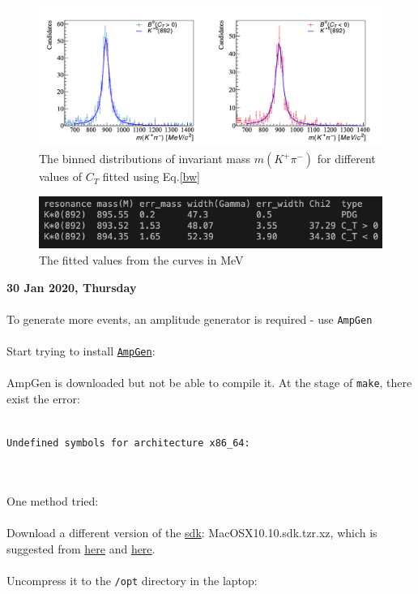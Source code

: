 \begin{figure}[h]
\center
\includegraphics*[width=0.86\linewidth]{CM_variables_B0/invmass_KpPim_fit}
\caption{The binned distributions of invariant mass $m(K^+\pi^-)$ for different values of $C_T$ fitted using Eq.\ref{bw}}
\label{kpi_fit}
\end{figure}

\begin{figure}[h]
\center
\includegraphics*[width=0.86\linewidth]{CM_variables_B0/invmasskpi_fitdata}
\caption{The fitted values from the curves in MeV}
\label{kpi_fitdata}
\end{figure}

\clearpage
\noindent\textbf{30 Jan 2020, Thursday}
\\
\\
To generate more events, an amplitude generator is required - use \texttt{AmpGen}
\\
\\
Start trying to install \href{https://github.com/GooFit/AmpGen#applications}{\texttt{AmpGen}}:
\\
\\
AmpGen is downloaded but not be able to compile it. At the stage of \texttt{make}, there exist the error:
\\\begin{itemize}
    \texttt{}
    \\
    \texttt{Undefined symbols for architecture x86\_64:}
\end{itemize}
\\
\\
One method tried:
\\
\\
Download a different version of the  \href{https://github.com/phracker/MacOSX-SDKs/releases}{sdk}:
MacOSX10.10.sdk.tzr.xz, which is suggested from \href{https://www.anaconda.com/utilizing-the-new-compilers-in-anaconda-distribution-5/}{here} and \href{https://github.com/ContinuumIO/anaconda-issues/issues/9096}{here}.
\\
\\
Uncompress it to the \texttt{/opt} directory in the laptop:

